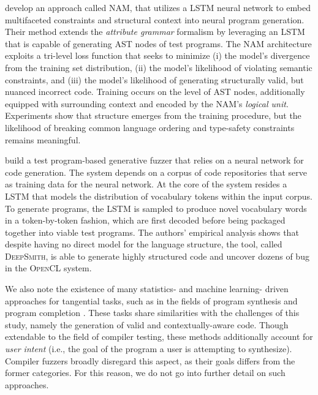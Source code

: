 
\citet{amodio2017neural} develop an approach called \gls{NAM},
that utilizes a \gls{LSTM} \cite{hochreiter1997long}
neural network to embed multifaceted constraints
and structural context into neural program generation.
Their method extends the \textit{attribute grammar}
formalism by leveraging an \gls{LSTM} that is capable
of generating \gls{AST} nodes of test programs.
The \gls{NAM} architecture exploits a tri-level
loss function that seeks to minimize 
(i) the model's divergence from the training set distribution,
(ii) the model's likelihood of violating semantic constraints, and
(iii) the model's likelihood of generating structurally valid, but nuanced incorrect code.
Training occurs on the level of \gls{AST} nodes,
additionally equipped with surrounding context and encoded
by the \gls{NAM}'s \textit{logical unit}.
Experiments show that structure emerges from the training procedure,
but the likelihood of breaking common language ordering and type-safety
constraints remains meaningful.

\citet{cummins2018compiler} build a test program-based generative fuzzer
that relies on a neural network for code generation.
The system depends on a corpus of code repositories
that serve as training data for the neural network.
At the core of the system resides a \gls{LSTM}
that models the distribution of vocabulary tokens within the input corpus.
To generate programs, the \gls{LSTM} is sampled to produce
novel vocabulary words in a token-by-token fashion,
which are first decoded before being packaged together into viable test programs.
The authors' empirical analysis shows that despite having no direct
model for the language structure, the tool, called \textsc{DeepSmith},
is able to generate highly structured code and uncover dozens of bug in the
\textsc{OpenCL} system.

We also note the existence of many statistics- and machine learning-
driven approaches for tangential tasks, such as in the fields of
program synthesis \cite{gulwani2017program} and
program completion \cite{raychev2014code}.
These tasks share similarities with the challenges of this
study, namely the generation of valid and contextually-aware code.
Though extendable to the field of compiler testing,
these methods additionally account for \textit{user intent}
(i.e., the goal of the program a user is attempting to synthesize).
Compiler fuzzers broadly disregard this aspect, as their goals differs from 
the former categories.
For this reason, we do not go into further detail on such approaches.

